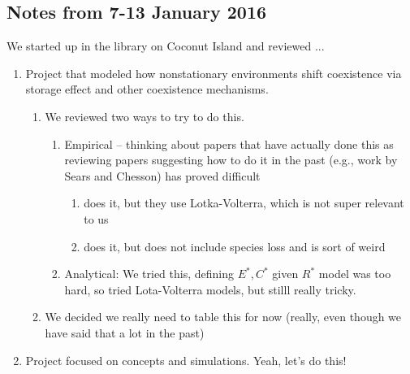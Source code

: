 \documentclass[11pt,a4paper,oneside]{article}
\begin{document}
\subsection{Notes from 7-13 January 2016}
We started up in the library on Coconut Island and reviewed ...
\begin{enumerate}
\item Project that modeled how nonstationary environments shift coexistence via storage effect and other coexistence mechanisms. 
\begin{enumerate}
\item We reviewed two ways to try to do this.
\begin{enumerate}
\item Empirical -- thinking about papers that have actually done this as reviewing papers suggesting how to do it in the past (e.g., work by Sears and Chesson) has proved difficult
\begin{enumerate}
\item \citet{godoy2014} does it, but they use Lotka-Volterra, which is not super relevant to us
\item \citet{Angert:2009} does it, but does not include species loss and is sort of weird
\end{enumerate}
\item Analytical: We tried this, defining $E^{*}, C^{*}$ given $R^{*}$ model was too hard, so tried Lota-Volterra models, but stilll really tricky. 
\end{enumerate}
\item We decided we really need to table this for now (really, even though we have said that a lot in the past)
\end{enumerate}
\item Project focused on concepts and simulations. Yeah, let's do this!
\end{enumerate}
\end{document}
